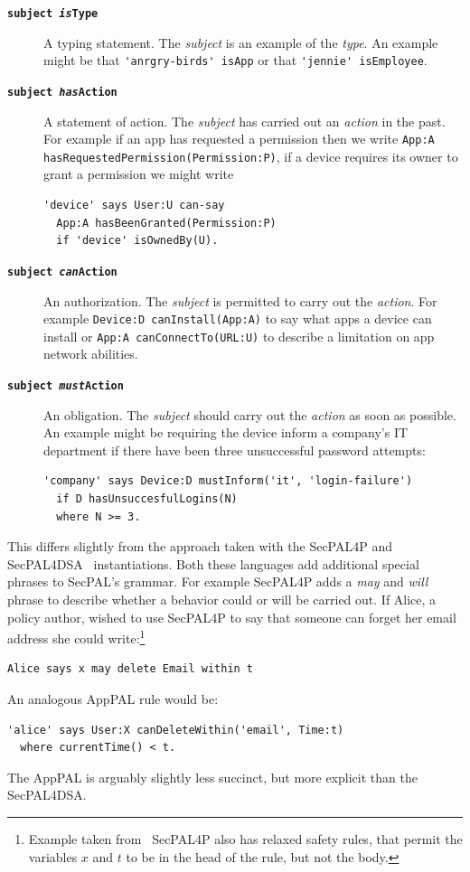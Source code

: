 \documentclass[thesis.tex]{subfiles}
\begin{document}
\begin{description}
\item[\bfseries\texttt{subject \emph{is}Type}]
  A typing statement.  The \emph{subject} is an example of the \emph{type}.  An
  example might be that \lstinline!'anrgry-birds' isApp! or that
  \lstinline!'jennie' isEmployee!.
\item[\bfseries\texttt{subject \emph{has}Action}]
  A statement of action.  The \emph{subject} has carried out an \emph{action} in
  the past. For example if an app has requested a permission then we write
  \lstinline!App:A hasRequestedPermission(Permission:P)!, if a device requires
  its owner to grant a permission we might write
  \begin{lstlisting}
'device' says User:U can-say
  App:A hasBeenGranted(Permission:P)
  if 'device' isOwnedBy(U).
  \end{lstlisting}
\item[\bfseries\texttt{subject \emph{can}Action}]
  An authorization. The \emph{subject} is permitted to carry out the \emph{action}.
  For example \lstinline!Device:D canInstall(App:A)! to say what apps a device
  can install or \lstinline!App:A canConnectTo(URL:U)! to describe a limitation
  on app network abilities.
\item[\bfseries\texttt{subject \emph{must}Action}]
  An obligation.  The \emph{subject} should carry out the \emph{action} as soon
  as possible.
  An example might be requiring the device inform a company's IT department if
  there have been three unsuccessful password attempts:
  \begin{lstlisting}
'company' says Device:D mustInform('it', 'login-failure')
  if D hasUnsuccesfulLogins(N)
  where N >= 3.
  \end{lstlisting}
\end{description}

This differs slightly from the approach taken with the SecPAL4P and SecPAL4DSA~\cite{becker_framework_2009,aziz_secpal4dsa:_2011} instantiations.
Both these languages add additional special phrases to SecPAL's grammar.
For example SecPAL4P adds a \emph{may} and \emph{will} phrase to describe whether a behavior could or will be carried out.
If Alice, a policy author, wished to use SecPAL4P to say that someone can forget her email address she could write:\footnote{%
Example taken from~\cite{becker_framework_2009}  SecPAL4P also has relaxed safety rules, that permit the variables $x$ and $t$ to be in the head of the rule, but not the body.}
\begin{lstlisting}
Alice says x may delete Email within t
\end{lstlisting}
An analogous AppPAL rule would be:
\begin{lstlisting}
'alice' says User:X canDeleteWithin('email', Time:t)
  where currentTime() < t.
\end{lstlisting}
The AppPAL is arguably slightly less succinct, but more explicit than the SecPAL4DSA.
\end{document}

